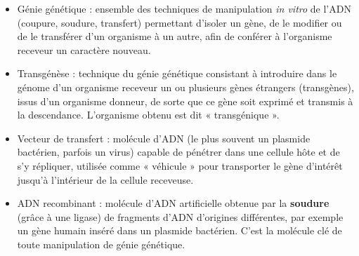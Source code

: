 \documentclass[11pt]{article}
\newcommand{\cle}[1]{{\popxbold\color{popdark}#1}}
\begin{document}
\begin{corrige}
\begin{itemize}
\item \cle{Génie génétique} : ensemble des techniques de manipulation \emph{in vitro} de l'ADN (coupure, soudure, transfert) permettant d'isoler un gène, de le modifier ou de le transférer d'un organisme à un autre, afin de conférer à l'organisme receveur un caractère nouveau.
\item \cle{Transgénèse} : technique du génie génétique consistant à introduire dans le génome d'un organisme receveur un ou plusieurs gènes étrangers (\cle{transgènes}), issus d'un organisme donneur, de sorte que ce gène soit exprimé et transmis à la descendance. L'organisme obtenu est dit « transgénique ».
\item \cle{Vecteur de transfert} : molécule d'ADN (le plus souvent un plasmide bactérien, parfois un virus) capable de pénétrer dans une cellule hôte et de s'y répliquer, utilisée comme « véhicule » pour transporter le gène d'intérêt jusqu'à l'intérieur de la cellule receveuse.
\item \cle{ADN recombinant} : molécule d'ADN artificielle obtenue par la \textbf{soudure} (grâce à une ligase) de fragments d'ADN d'origines différentes, par exemple un gène humain inséré dans un plasmide bactérien. C'est la molécule clé de toute manipulation de génie génétique.
\end{itemize}
\end{corrige}
\end{document}
